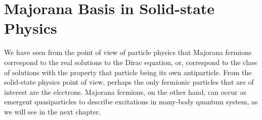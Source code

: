 \documentclass[11pt, oneside]{book}
\theoremstyle{break}
\theoremstyle{break}
\newcommand{\that}[1]{\widetilde{#1}}
\begin{document}

\section{Majorana Basis in Solid-state Physics}
We have seen from the point of view of particle physics that Majorana fermions correspond to the real solutions to the Dirac equation, or, correspond to the class of solutions with the property that particle being its own antiparticle. From the solid-state physics point of view, perhaps the only fermionic particles that are of interest are the electrons. Majorana fermions, on the other hand, can occur as emergent quasiparticles to describe excitations in many-body quantum system, as we will see in the next chapter.\\
\end{document}
